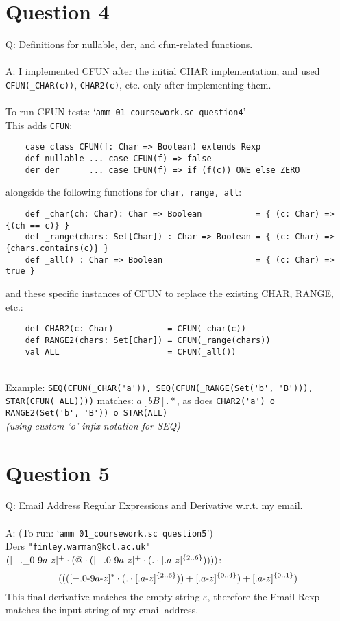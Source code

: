 \documentclass[english]{scrartcl}
\begin{document}
\section*{Question 4}
Q: Definitions for nullable, der, and cfun-related functions.
\\
\\
A: I implemented CFUN after the initial CHAR implementation, and used \verb|CFUN(_CHAR(c))|, \verb|CHAR2(c)|, etc. only after implementing them.\\
\\
To run CFUN tests: `\verb|amm 01_coursework.sc question4|' \\
This adds \verb|CFUN|:
\begin{verbatim}
    case class CFUN(f: Char => Boolean) extends Rexp
    def nullable ... case CFUN(f) => false
    der der      ... case CFUN(f) => if (f(c)) ONE else ZERO
\end{verbatim}
alongside the following functions for \verb|char, range, all|:
\begin{verbatim}
    def _char(ch: Char): Char => Boolean           = { (c: Char) => {(ch == c)} }
    def _range(chars: Set[Char]) : Char => Boolean = { (c: Char) => {chars.contains(c)} }
    def _all() : Char => Boolean                   = { (c: Char) => true }
\end{verbatim}
and these specific instances of CFUN to replace the existing CHAR, RANGE, etc.:
\begin{verbatim}
    def CHAR2(c: Char)           = CFUN(_char(c))
    def RANGE2(chars: Set[Char]) = CFUN(_range(chars))
    val ALL                      = CFUN(_all())
\end{verbatim}

\mbox{}\\
Example: \verb|SEQ(CFUN(_CHAR('a')), SEQ(CFUN(_RANGE(Set('b', 'B'))), STAR(CFUN(_ALL))))|
matches: $a[bB].*$, as does \verb|CHAR2('a') o RANGE2(Set('b', 'B')) o STAR(ALL)| \\
\textit{(using custom `o' infix notation for SEQ)}

\section*{Question 5}
Q: Email Address Regular Expressions and Derivative w.r.t. my email.
\\
\\
A: (To run: `\verb|amm 01_coursework.sc question5|') \\
Ders \verb~"finley.warman@kcl.ac.uk" ~$([-.\_0{\text -}9a{\text -}z]^+\cdot(@\cdot([-.0{\text -}9a{\text -}z]^+\cdot(.\cdot[.a{\text -}z]^{\{2..6\}}))))$:
\[
    ((([-.0{\text -}9a{\text -}z]^* \cdot (. \cdot [.a{\text -}z]^{\{2..6\}})) + [.a{\text -}z]^{\{0..4\}}) + [.a{\text -}z]^{\{0..1\}})
\]
This final derivative matches the empty string $\varepsilon$, therefore the Email Rexp matches the input string of my email address.
\end{document}
